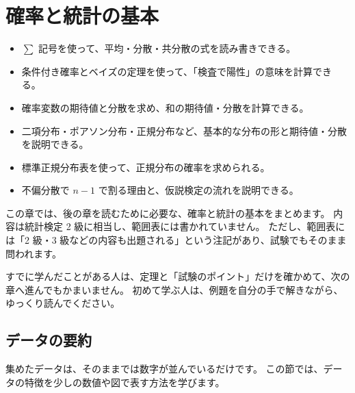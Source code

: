 \chapter{確率と統計の基本}
\label{chap:stat-preparation}

\begin{chaptergoal}
  \begin{itemize}
    \item $\sum$ 記号を使って、平均・分散・共分散の式を読み書きできる。
    \item 条件付き確率とベイズの定理を使って、「検査で陽性」の意味を計算できる。
    \item 確率変数の期待値と分散を求め、和の期待値・分散を計算できる。
    \item 二項分布・ポアソン分布・正規分布など、基本的な分布の形と期待値・分散を説明できる。
    \item 標準正規分布表を使って、正規分布の確率を求められる。
    \item 不偏分散で $n-1$ で割る理由と、仮説検定の流れを説明できる。
  \end{itemize}
\end{chaptergoal}


この章では、後の章を読むために必要な、確率と統計の基本をまとめます。
内容は統計検定 2 級に相当し、範囲表には書かれていません。
ただし、範囲表には「2 級・3 級などの内容も出題される」という注記があり、試験でもそのまま問われます。

すでに学んだことがある人は、定理と「試験のポイント」だけを確かめて、次の章へ進んでもかまいません。
初めて学ぶ人は、例題を自分の手で解きながら、ゆっくり読んでください。

\section{データの要約}
\label{sec:stat-summary}

集めたデータは、そのままでは数字が並んでいるだけです。
この節では、データの特徴を少しの数値や図で表す方法を学びます。

